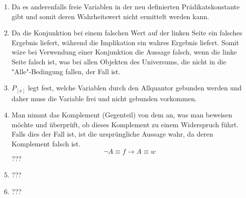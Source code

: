 \documentclass[a4paper]{article}
\begin{document}
\begin{enumerate}
		\item
		Da es anderenfalls freie Variablen in der neu definierten Prädikatskonstante gibt und somit deren Wahrheitswert nicht ermittelt werden kann.
		
		\item
		Da die Konjunktion bei einem falschen Wert auf der linken Seite ein falsches Ergebnis liefert, während die Implikation ein wahres Ergebnis liefert. Somit wäre bei Verwendung einer Konjunktion die Aussage falsch, wenn die linke Seite falsch ist, was bei allen Objekten des Universums, die nicht in die "Alle"-Bedingung fallen, der Fall ist.
		
		\item
		$P_[x]$ legt fest, welche Variablen durch den Allquantor gebunden werden und daher muss die Variable frei und nicht gebunden vorkommen.
		
		\item
		Man nimmt das Komplement (Gegenteil) von dem an, was man beweisen möchte und überprüft, ob dieses Komplement zu einem Widerspruch führt. Falls dies der Fall ist, ist die ursprüngliche Aussage wahr, da deren Komplement falsch ist.
		\begin{equation*}
			\lnot A \equiv f \rightarrow A \equiv w
		\end{equation*}
		\newline
		???
		
		\item
		???
		
		\item
		???
	\end{enumerate}
\end{document}
